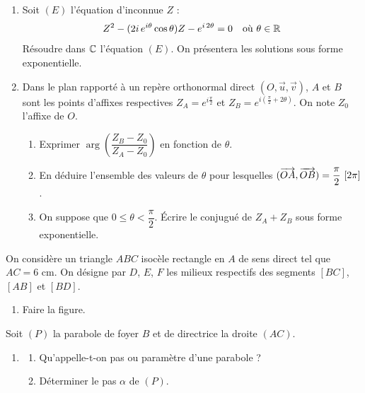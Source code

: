 \documentclass[11pt]{article}
\begin{document}


\begin{enumerate}
  \item Soit $(E)$ l'équation d'inconnue $Z$ :
  \[ Z^2 - (2i\,e^{i\theta}\cos\theta)Z - e^{i\,2\theta} = 0 \quad \text{où } \theta \in \mathbb{R} \]
  Résoudre dans $\mathbb{C}$ l'équation $(E)$. On présentera les solutions sous forme exponentielle.
  \item Dans le plan rapporté à un repère orthonormal direct $(O,\vec{u},\vec{v})$, $A$ et $B$ sont les points d'affixes respectives $Z_A = e^{i\frac{\pi}{2}}$ et $Z_B = e^{i\left(\frac{\pi}{2}+2\theta\right)}$. On note $Z_0$ l'affixe de $O$.
  \begin{enumerate}[label=\alph*.]
    \item Exprimer $\arg\left(\dfrac{Z_B - Z_0}{Z_A - Z_0}\right)$ en fonction de $\theta$.
    \item En déduire l'ensemble des valeurs de $\theta$ pour lesquelles $(\overrightarrow{OA},\overrightarrow{OB}) = \dfrac{\pi}{2}\ [2\pi]$.
    \item On suppose que $0 \le \theta < \dfrac{\pi}{2}$. Écrire le conjugué de $Z_A + Z_B$ sous forme exponentielle.
  \end{enumerate}
\end{enumerate}


On considère un triangle $ABC$ isocèle rectangle en $A$ de sens direct tel que $AC = 6$ cm. On désigne par $D$, $E$, $F$ les milieux respectifs des segments $[BC]$, $[AB]$ et $[BD]$.

\begin{enumerate}
  \item Faire la figure.
\end{enumerate}

Soit $(P)$ la parabole de foyer $B$ et de directrice la droite $(AC)$.

\begin{enumerate}[start=2]
  \item \begin{enumerate}[label=\alph*.]
    \item Qu'appelle-t-on pas ou paramètre d'une parabole ?
    \item Déterminer le pas $\alpha$ de $(P)$.
  \end{enumerate}
\end{enumerate}
\end{document}
